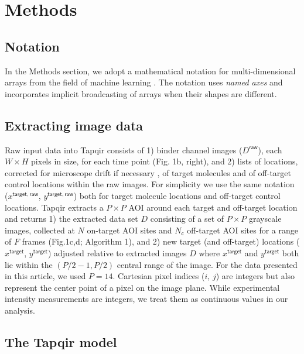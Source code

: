 \section*{Methods}

\subsection*{Notation} 

In the Methods section, we adopt a mathematical notation for multi-dimensional arrays from the field of machine learning  \cite{Chiang2021-fi}.  The notation uses \textit{named axes} and incorporates implicit broadcasting of arrays when their shapes are different.

\subsection*{Extracting image data} 

Raw input data into Tapqir consists of 1) binder channel images ($D^\mathsf{raw}$), each $W \times H$ pixels in size, for each time point (Fig. 1b, right), and 2)  lists of locations, corrected for microscope drift if necessary \cite{Friedman2015-nx}, of target molecules and of off-target control locations  \cite{Friedman2015-nx} within the raw images. For simplicity we use the same notation ($x^{\mathsf{target}, \mathsf{raw}}$, $y^{\mathsf{target}, \mathsf{raw}}$) both for target molecule locations and off-target control locations. Tapqir extracts a $P \times P$ AOI around each target and off-target location and returns 1) the extracted data set $D$ consisting of a set of $P \times P$ grayscale images, collected at $N$ on-target AOI sites and $N_\mathsf{c}$  off-target AOI sites for a range of $F$ frames (Fig.1c,d; Algorithm 1), and 2) new target (and off-target) locations ($x^\mathsf{target}$, $y^\mathsf{target}$) adjusted relative to extracted images $D$ where $x^\mathsf{target}$ and $y^\mathsf{target}$ both lie within the $(P/2-1,P/2)$ central range of the image. For the data presented in this article, we used $P = 14$. Cartesian pixel indices ($i$, $j$) are integers but also represent the center point of a pixel on the image plane. While experimental intensity measurements are integers, we treat them as continuous values in our analysis.



\subsection*{The Tapqir model} 

